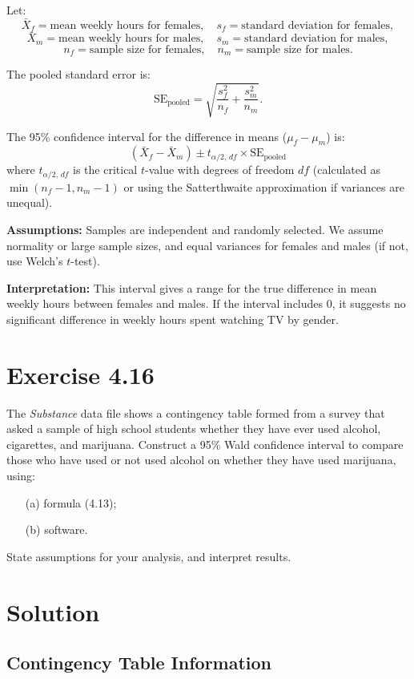 \documentclass{article}
\begin{document}
Let:
\[
\bar{X}_f = \text{mean weekly hours for females}, \quad s_f = \text{standard deviation for females},
\]
\[
\bar{X}_m = \text{mean weekly hours for males}, \quad s_m = \text{standard deviation for males},
\]
\[
n_f = \text{sample size for females}, \quad n_m = \text{sample size for males}.
\]

The pooled standard error is:
\[
\text{SE}_{\text{pooled}} = \sqrt{\frac{s_f^2}{n_f} + \frac{s_m^2}{n_m}}.
\]

The 95\% confidence interval for the difference in means (\( \mu_f - \mu_m \)) is:
\[
(\bar{X}_f - \bar{X}_m) \pm t_{\alpha/2, \, df} \times \text{SE}_{\text{pooled}}
\]
where \( t_{\alpha/2, \, df} \) is the critical \( t \)-value with degrees of freedom \( df \) (calculated as \( \min(n_f - 1, n_m - 1) \) or using the Satterthwaite approximation if variances are unequal).

\textbf{Assumptions:} Samples are independent and randomly selected. We assume normality or large sample sizes, and equal variances for females and males (if not, use Welch’s \( t \)-test).

\textbf{Interpretation:} This interval gives a range for the true difference in mean weekly hours between females and males. If the interval includes 0, it suggests no significant difference in weekly hours spent watching TV by gender.

\section*{Exercise 4.16}

The \textit{Substance} data file shows a contingency table formed from a survey that asked a sample of high school students whether they have ever used alcohol, cigarettes, and marijuana. Construct a 95\% Wald confidence interval to compare those who have used or not used alcohol on whether they have used marijuana, using:
\begin{enumerate}
    \item[(a)] formula (4.13);
    \item[(b)] software.
\end{enumerate}

State assumptions for your analysis, and interpret results.

\section*{Solution}

\subsection*{Contingency Table Information}
\end{document}
